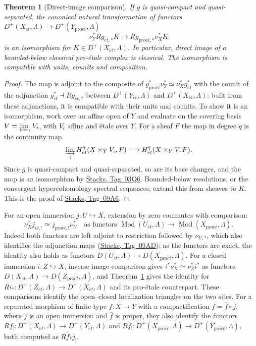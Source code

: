\documentclass[11pt,a4paper]{article}
\numberwithin{equation}{section}
\newtheorem{theorem}{Theorem}[section]
\theoremstyle{definition}
\theoremstyle{remark}
\newcommand{\Mod}{\operatorname{Mod}}
\newcommand{\et}{\acute{e}t}
\newcommand{\proet}{\mathrm{pro}\acute{e}t}
\newcommand{\stacks}[1]{\href{https://stacks.math.columbia.edu/tag/#1}{\textnormal{Stacks, Tag~#1}}}
\begin{document}
\begin{theorem}[Direct-image comparison]
\label{pe:direct-image-comparison}
If $g$ is quasi-compact and quasi-separated, the canonical natural
transformation of functors $D^+(X_{\et},\Lambda)\to D^+(Y_{\proet},\Lambda)$
\begin{equation}\label{pe:eq:direct-image-comparison}
 \nu_Y^*Rg_{\et,*}K\longrightarrow
 Rg_{\proet,*}\nu_X^*K
\end{equation}
is an isomorphism for $K\in D^+(X_{\et},\Lambda)$. In particular,
direct image of a bounded-below classical pro-\'etale complex is
classical. The isomorphism is compatible with units, counits and
composition.
\end{theorem}
\begin{proof}
The map is adjoint to the composite of
$g_{\proet}^*\nu_Y^*\simeq\nu_X^*g_{\et}^*$ with the counit of the adjunction
$g_{\et}^*\dashv Rg_{\et,*}$ between $D^+(Y_{\et},\Lambda)$ and
$D^+(X_{\et},\Lambda)$; built from these adjunctions, it is
compatible with their units and counits. To show it is an
isomorphism, work over an affine open of $Y$ and evaluate on the
covering basis $V=\varprojlim_iV_i$, with $V_i$ affine and \'etale
over $Y$. For a sheaf $F$ the map in degree $q$ is the continuity map
\[
 \varinjlim_i H^q_{\et}(X\times_YV_i,F)
   \longrightarrow
 H^q_{\et}(X\times_YV,F).
\]
Since $g$ is quasi-compact and quasi-separated, so are its base
changes, and the map is an isomorphism by \stacks{03Q6}. Bounded-below
resolutions, or the convergent hypercohomology spectral sequences,
extend this from sheaves to $K$. This is the proof of \stacks{09A6}.
\end{proof}

For an open immersion $j:U\hookrightarrow X$, extension by zero
commutes with comparison:
\begin{equation}\label{pe:eq:jshriek-comparison}
 \nu_X^*j_{\et,!}\simeq j_{\proet,!}\nu_U^*\quad\text{as functors }\Mod(U_{\et},\Lambda)\to\Mod(X_{\proet},\Lambda).
\end{equation}
Indeed both functors are left adjoint to restriction followed by
$\nu_{U,*}$, which also identifies the adjunction maps (\stacks{09AD});
as the functors are exact, the identity also holds as functors
$D(U_{\et},\Lambda)\to D(X_{\proet},\Lambda)$.
For a closed immersion $i:Z\hookrightarrow X$, inverse-image comparison
gives $i^*\nu_X^*\simeq\nu_Z^*i^*$ as functors
$D(X_{\et},\Lambda)\to D(Z_{\proet},\Lambda)$, and
Theorem~\ref{pe:direct-image-comparison} gives the identity for
$Ri_*\colon D^+(Z_{\et},\Lambda)\to D^+(X_{\et},\Lambda)$ and its
pro-\'etale counterpart. These comparisons identify the open--closed
localization triangles on the two sites. For a separated morphism of
finite type $f:X\to Y$ with a compactification $f=\bar f\circ j$, where
$j$ is an open immersion and $\bar f$ is proper, they also identify
the functors $Rf_!\colon D^+(X_{\et},\Lambda)\to D^+(Y_{\et},\Lambda)$
and $Rf_!\colon D^+(X_{\proet},\Lambda)\to D^+(Y_{\proet},\Lambda)$,
both computed as $R\bar f_*j_!$.
\end{document}
